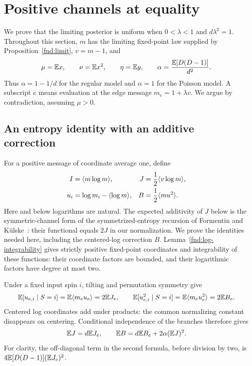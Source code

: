 \section{Positive channels at equality}\label{sec:positive}

We prove that the limiting posterior is uniform when
\(0<\lambda<1\) and \(d\lambda^2=1\). Throughout this section,
\(m\) has the limiting fixed-point law supplied by Proposition~\ref{fnd:limit},
\(v=m-1\), and
\[
 \mu=\mathbb E x,\qquad \nu=\mathbb E x^2,\qquad \eta=\mathbb E y,\qquad
 \alpha=\frac{\mathbb E[D(D-1)]}{d^2}.
\]
Thus \(\alpha=1-1/d\) for the regular model and \(\alpha=1\) for the
Poisson model. A subscript \(e\) means evaluation at the edge message
\(m_e=1+\lambda v\). We argue by contradiction, assuming \(\mu>0\).

\subsection{An entropy identity with an additive correction}

For a positive message of coordinate average one, define
\begin{equation}\label{pos:functionals}
 \begin{aligned}
 I&=\langle m\log m\rangle,& J&=\frac12\langle v\log m\rangle,\\
 u_i&=\log m_i-\langle \log m\rangle,& B&=\frac12\langle m u^2\rangle.
 \end{aligned}
\end{equation}
Here and below logarithms are natural. The expected additivity of $J$
below is the symmetric-channel form of the symmetrized-entropy recursion
of Formentin and K\"ulske~\cite[Proposition~3.3, equation~(15)]{FormentinKulske2009Entropy}:
their functional equals $2J$ in our normalization. We prove the identities
needed here, including the centered-log correction $B$.
Lemma~\ref{fnd:log-integrability} gives strictly positive fixed-point
coordinates and integrability of these functions: their coordinate factors
are bounded, and their logarithmic factors have degree at most two.

Under a fixed input spin \(i\), tilting and permutation symmetry give
\[
 \mathbb E[u_{e,i}\mid S=i]=\mathbb E\langle m_eu_e\rangle=2\mathbb E J_e,
 \qquad
 \mathbb E[u_{e,i}^2\mid S=i]=\mathbb E\langle m_eu_e^2\rangle=2\mathbb E B_e.
\]
Centered log coordinates add under products: the common normalizing
constant disappears on centering. Conditional independence of the branches
therefore gives
\begin{equation}\label{pos:additive}
 \mathbb E J=d\mathbb E J_e,\qquad
 \mathbb E B=d\mathbb E B_e+2\alpha(\mathbb E J)^2.
\end{equation}
For clarity, the off-diagonal term in the second formula, before division
by two, is \(4\mathbb E[D(D-1)](\mathbb E J_e)^2\).

